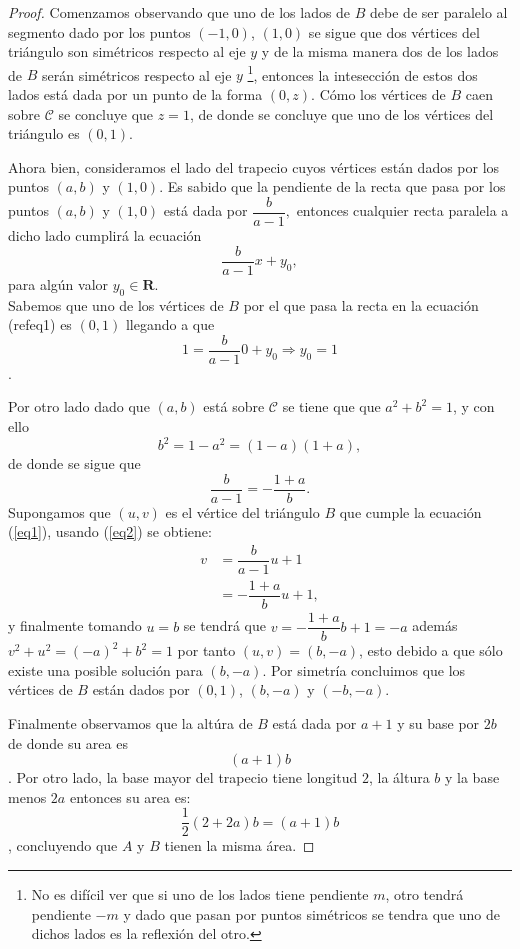 \begin{proof}
  Comenzamos observando que uno de los lados de $B$
  debe de ser paralelo al segmento dado por los puntos
  $(-1,0)$, $(1,0)$
  se sigue que dos vértices del triángulo
  son simétricos respecto al eje $y$
  y de la misma manera dos de los lados de $B$
  serán simétricos respecto al eje $y$
  \footnote{
    No es difícil ver que si uno de los lados
    tiene pendiente $m$,
    otro tendrá pendiente $-m$
    y dado que pasan por puntos simétricos
    se tendra que uno de dichos lados es la reflexión del otro.
  },
  entonces la intesección de estos dos lados
  está dada por un punto de la forma $(0,z)$.
  Cómo los vértices de $B$ caen sobre $\mathcal{C}$
  se concluye que $z=1$,
  de donde se concluye que uno de los vértices del triángulo es $(0,1)$.

  Ahora bien, consideramos el lado del trapecio
  cuyos vértices están dados por los puntos
  $(a,b)$ y $(1,0)$.
  Es sabido que la pendiente de la recta que pasa
  por los puntos $(a,b)$ y $(1,0)$ está dada por
  $ \dfrac{b}{a-1}, $
  entonces cualquier recta paralela a dicho lado cumplirá la ecuación
  \begin{equation}\label{eq1}
    \dfrac{b}{a-1}x+y_0,
  \end{equation}
  para algún valor $y_0 \in \mathbf{R}$.\\
  Sabemos que uno de los vértices de $B$
  por el que pasa la recta en la ecuación (ref{eq1}) es $(0,1)$
  llegando a que
  $$1=\dfrac{b}{a-1}0+y_0 \Rightarrow y_0=1$$.

  Por otro lado dado que $(a,b)$ está sobre $\mathcal{C}$
  se tiene que que $a^2+ b^2=1$, y con ello
  $$ b^2 = 1-a^2=(1-a)(1+a),$$
  de donde se sigue que
  \begin{equation}\label{eq2}
    \dfrac{b}{a-1}= -\dfrac{1+a}{b}.
  \end{equation}
  Supongamos que $(u,v)$ es el vértice del triángulo $B$
  que cumple la ecuación (\ref{eq1}),
  usando (\ref{eq2}) se obtiene:
  \begin{align*}
    v&=  \dfrac{b}{a-1}u+1\\
    &= -\dfrac{1+a}{b} u + 1,
  \end{align*}
  y finalmente tomando $u=b$
  se tendrá que $v=-\dfrac{1+a}{b}b+1=-a$
  además $v^2+u^2=(-a)^2+b^2=1$
  por tanto $(u,v)=(b,-a)$,
  esto debido a que sólo existe una posible solución para $(b,-a)$.
  Por simetría concluimos que los vértices de $B$
  están dados por $(0,1)$, $(b,-a)$ y $(-b,-a)$.

  Finalmente observamos que la altúra de $B$ está dada por $a+1$
  y su base por $2b$
  de donde su area es $$(a+1)b$$.
  Por otro lado,
  la base mayor del trapecio tiene longitud $2$,
  la áltura $b$ y la base menos $2a$
  entonces su area es:
  $$\dfrac{1}{2}(2+2a)b=(a+1)b$$,
  concluyendo que $A$ y $B$ tienen la misma área.
\end{proof}
